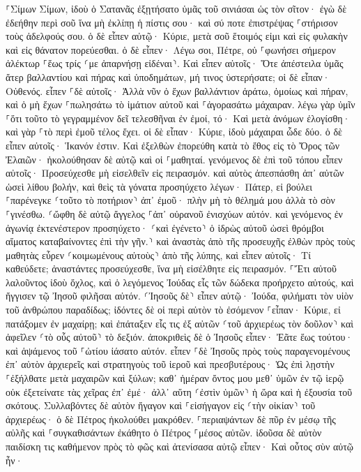 \documentclass[twoside, 9pt]{extreport}
\begin{document}
⸀Σίμων Σίμων, ἰδοὺ ὁ Σατανᾶς ἐξῃτήσατο ὑμᾶς τοῦ σινιάσαι ὡς τὸν σῖτον· 
ἐγὼ δὲ ἐδεήθην περὶ σοῦ ἵνα μὴ ἐκλίπῃ ἡ πίστις σου· καὶ σύ ποτε ἐπιστρέψας ⸀στήρισον τοὺς ἀδελφούς σου. 
ὁ δὲ εἶπεν αὐτῷ· Κύριε, μετὰ σοῦ ἕτοιμός εἰμι καὶ εἰς φυλακὴν καὶ εἰς θάνατον πορεύεσθαι. 
ὁ δὲ εἶπεν· Λέγω σοι, Πέτρε, οὐ ⸀φωνήσει σήμερον ἀλέκτωρ ⸀ἕως τρίς ⸂με ἀπαρνήσῃ εἰδέναι⸃. 
Καὶ εἶπεν αὐτοῖς· Ὅτε ἀπέστειλα ὑμᾶς ἄτερ βαλλαντίου καὶ πήρας καὶ ὑποδημάτων, μή τινος ὑστερήσατε; οἱ δὲ εἶπαν· Οὐθενός. 
εἶπεν ⸀δὲ αὐτοῖς· Ἀλλὰ νῦν ὁ ἔχων βαλλάντιον ἀράτω, ὁμοίως καὶ πήραν, καὶ ὁ μὴ ἔχων ⸀πωλησάτω τὸ ἱμάτιον αὐτοῦ καὶ ⸀ἀγορασάτω μάχαιραν. 
λέγω γὰρ ὑμῖν ⸀ὅτι τοῦτο τὸ γεγραμμένον δεῖ τελεσθῆναι ἐν ἐμοί, τό· Καὶ μετὰ ἀνόμων ἐλογίσθη· καὶ γὰρ ⸀τὸ περὶ ἐμοῦ τέλος ἔχει. 
οἱ δὲ εἶπαν· Κύριε, ἰδοὺ μάχαιραι ὧδε δύο. ὁ δὲ εἶπεν αὐτοῖς· Ἱκανόν ἐστιν. 
Καὶ ἐξελθὼν ἐπορεύθη κατὰ τὸ ἔθος εἰς τὸ Ὄρος τῶν Ἐλαιῶν· ἠκολούθησαν δὲ αὐτῷ καὶ οἱ ⸀μαθηταί. 
γενόμενος δὲ ἐπὶ τοῦ τόπου εἶπεν αὐτοῖς· Προσεύχεσθε μὴ εἰσελθεῖν εἰς πειρασμόν. 
καὶ αὐτὸς ἀπεσπάσθη ἀπ᾽ αὐτῶν ὡσεὶ λίθου βολήν, καὶ θεὶς τὰ γόνατα προσηύχετο 
λέγων· Πάτερ, εἰ βούλει ⸀παρένεγκε ⸂τοῦτο τὸ ποτήριον⸃ ἀπ᾽ ἐμοῦ· πλὴν μὴ τὸ θέλημά μου ἀλλὰ τὸ σὸν ⸀γινέσθω. 
⸂ὤφθη δὲ αὐτῷ ἄγγελος ⸀ἀπ᾽ οὐρανοῦ ἐνισχύων αὐτόν. 
καὶ γενόμενος ἐν ἀγωνίᾳ ἐκτενέστερον προσηύχετο· ⸂καὶ ἐγένετο⸃ ὁ ἱδρὼς αὐτοῦ ὡσεὶ θρόμβοι αἵματος καταβαίνοντες ἐπὶ τὴν γῆν.⸃ 
καὶ ἀναστὰς ἀπὸ τῆς προσευχῆς ἐλθὼν πρὸς τοὺς μαθητὰς εὗρεν ⸂κοιμωμένους αὐτοὺς⸃ ἀπὸ τῆς λύπης, 
καὶ εἶπεν αὐτοῖς· Τί καθεύδετε; ἀναστάντες προσεύχεσθε, ἵνα μὴ εἰσέλθητε εἰς πειρασμόν. 
⸀Ἔτι αὐτοῦ λαλοῦντος ἰδοὺ ὄχλος, καὶ ὁ λεγόμενος Ἰούδας εἷς τῶν δώδεκα προήρχετο αὐτούς, καὶ ἤγγισεν τῷ Ἰησοῦ φιλῆσαι αὐτόν. 
⸂Ἰησοῦς δὲ⸃ εἶπεν αὐτῷ· Ἰούδα, φιλήματι τὸν υἱὸν τοῦ ἀνθρώπου παραδίδως; 
ἰδόντες δὲ οἱ περὶ αὐτὸν τὸ ἐσόμενον ⸀εἶπαν· Κύριε, εἰ πατάξομεν ἐν μαχαίρῃ; 
καὶ ἐπάταξεν εἷς τις ἐξ αὐτῶν ⸂τοῦ ἀρχιερέως τὸν δοῦλον⸃ καὶ ἀφεῖλεν ⸂τὸ οὖς αὐτοῦ⸃ τὸ δεξιόν. 
ἀποκριθεὶς δὲ ὁ Ἰησοῦς εἶπεν· Ἐᾶτε ἕως τούτου· καὶ ἁψάμενος τοῦ ⸀ὠτίου ἰάσατο αὐτόν. 
εἶπεν ⸀δὲ Ἰησοῦς πρὸς τοὺς παραγενομένους ἐπ᾽ αὐτὸν ἀρχιερεῖς καὶ στρατηγοὺς τοῦ ἱεροῦ καὶ πρεσβυτέρους· Ὡς ἐπὶ λῃστὴν ⸀ἐξήλθατε μετὰ μαχαιρῶν καὶ ξύλων; 
καθ᾽ ἡμέραν ὄντος μου μεθ᾽ ὑμῶν ἐν τῷ ἱερῷ οὐκ ἐξετείνατε τὰς χεῖρας ἐπ᾽ ἐμέ· ἀλλ᾽ αὕτη ⸂ἐστὶν ὑμῶν⸃ ἡ ὥρα καὶ ἡ ἐξουσία τοῦ σκότους. 
Συλλαβόντες δὲ αὐτὸν ἤγαγον καὶ ⸀εἰσήγαγον εἰς ⸂τὴν οἰκίαν⸃ τοῦ ἀρχιερέως· ὁ δὲ Πέτρος ἠκολούθει μακρόθεν. 
⸀περιαψάντων δὲ πῦρ ἐν μέσῳ τῆς αὐλῆς καὶ ⸀συγκαθισάντων ἐκάθητο ὁ Πέτρος ⸀μέσος αὐτῶν. 
ἰδοῦσα δὲ αὐτὸν παιδίσκη τις καθήμενον πρὸς τὸ φῶς καὶ ἀτενίσασα αὐτῷ εἶπεν· Καὶ οὗτος σὺν αὐτῷ ἦν· 
\end{document}
